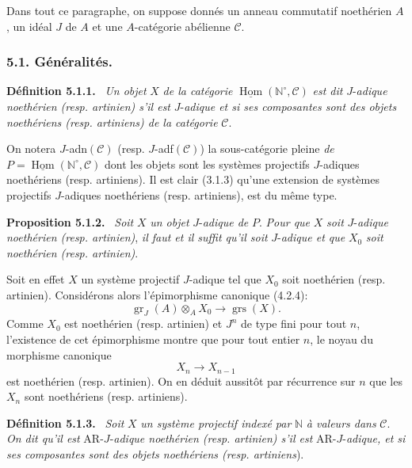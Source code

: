 \documentclass[11pt]{article}
\newenvironment{statement}[1]{\par\medskip\noindent\textbf{#1.}\ }{\par\medskip}
\DeclareMathOperator{\Hom}{Hom}
\providecommand{\uHom}{\underline{\Hom}}
\providecommand{\gr}{\operatorname{gr}}
\providecommand{\Hom}{\operatorname{Hom}}
\providecommand{\gr}{\operatorname{gr}}
\providecommand{\gr}{\operatorname{gr}}
\providecommand{\grs}{\operatorname{grs}}
\providecommand{\Hom}{\operatorname{Hom}}
\begin{document}
Dans tout ce paragraphe, on suppose donnés un anneau commutatif noethérien \(A\), un idéal \(J\) de \(A\) et une \(A\)-catégorie abélienne \(\mathcal C\).

\subsubsection*{5.1. Généralités.}

\begin{statement}{Définition 5.1.1}
\emph{Un objet} \(X\) \emph{de la catégorie} \(\uHom(\mathbb N^\circ,\mathcal C)\) \emph{est dit} \(J\)-\emph{adique noethérien (resp. artinien) s'il est} \(J\)-\emph{adique et si ses composantes sont des objets noethériens (resp. artiniens) de la catégorie} \(\mathcal C\).
\end{statement}

On notera \(J\)-adn\((\mathcal C)\) (resp. \(J\)-adf\((\mathcal C)\)) la sous-catégorie pleine \emph{de}
\(P=\uHom(\mathbb N^\circ,\mathcal C)\) dont les objets sont les systèmes projectifs \(J\)-adiques noethériens (resp. artiniens). Il est clair (3.1.3) qu'une extension de systèmes projectifs \(J\)-adiques noethériens (resp. artiniens), est du même type.

\begin{statement}{Proposition 5.1.2}
\emph{Soit} \(X\) \emph{un objet} \(J\)-\emph{adique de} \(P\). \emph{Pour que} \(X\) \emph{soit} \(J\)-\emph{adique noethérien (resp. artinien)}, \emph{il faut et il suffit qu'il soit} \(J\)-\emph{adique et que} \(X_0\) \emph{soit noethérien (resp. artinien)}.
\end{statement}

Soit en effet \(X\) un système projectif \(J\)-adique tel que \(X_0\) soit noethérien (resp. artinien). Considérons alors l'épimorphisme canonique (4.2.4):
\[
\gr_J(A)\otimes_A X_0\longrightarrow \grs(X).
\]
Comme \(X_0\) est noethérien (resp. artinien) et \(J^n\) de type fini pour tout \(n\), l'existence de cet épimorphisme montre que pour tout entier \(n\), le noyau du morphisme canonique
\[
X_n\longrightarrow X_{n-1}
\]
est noethérien (resp. artinien). On en déduit aussitôt par récurrence sur \(n\) que les \(X_n\) sont noethériens (resp. artiniens).

\begin{statement}{Définition 5.1.3}
\emph{Soit} \(X\) \emph{un système projectif indexé par} \(\mathbb N\) \emph{à valeurs dans} \(\mathcal C\). \emph{On dit qu'il est} AR-\(J\)-\emph{adique noethérien (resp. artinien) s'il est} AR-\(J\)-\emph{adique, et si ses composantes sont des objets noethériens (resp. artiniens}).
\end{statement}
\end{document}
